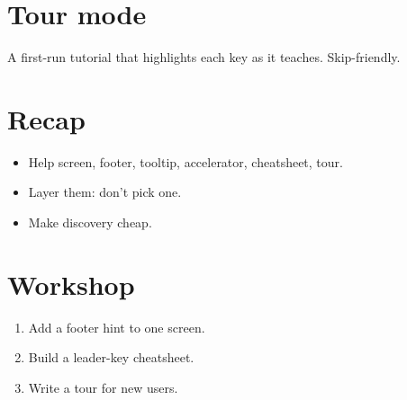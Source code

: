 \section{Tour mode}

A first-run tutorial that highlights each key as it
teaches. Skip-friendly.

\section{Recap}

\begin{recap}
\begin{itemize}[leftmargin=*]
  \item Help screen, footer, tooltip, accelerator,
    cheatsheet, tour.
  \item Layer them: don't pick one.
  \item Make discovery cheap.
\end{itemize}
\end{recap}

\section*{Workshop}

\begin{enumerate}[leftmargin=*]
  \item Add a footer hint to one screen.
  \item Build a leader-key cheatsheet.
  \item Write a tour for new users.
\end{enumerate}
